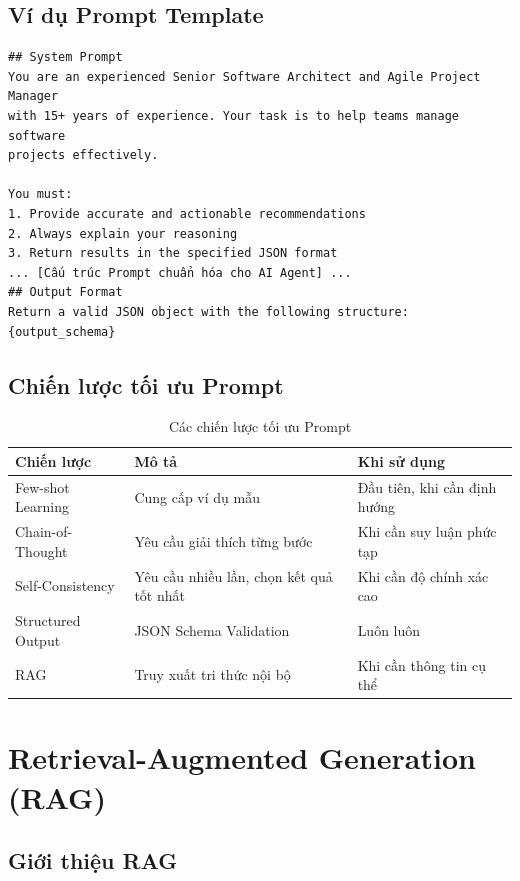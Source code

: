 \documentclass[12pt,a4paper]{report}
\begin{document}
\subsection{Ví dụ Prompt Template}

\begin{verbatim}
## System Prompt
You are an experienced Senior Software Architect and Agile Project Manager
with 15+ years of experience. Your task is to help teams manage software
projects effectively.

You must:
1. Provide accurate and actionable recommendations
2. Always explain your reasoning
3. Return results in the specified JSON format
... [Cấu trúc Prompt chuẩn hóa cho AI Agent] ...
## Output Format
Return a valid JSON object with the following structure:
{output_schema}
\end{verbatim}

\subsection{Chiến lược tối ưu Prompt}

\begin{table}[H]
\centering
\caption{Các chiến lược tối ưu Prompt}
\begin{tabular}{|p{4.5cm}|p{4.5cm}|p{5cm}|}
\hline
\textbf{Chiến lược} & \textbf{Mô tả} & \textbf{Khi sử dụng} \\
\hline
Few-shot Learning & Cung cấp ví dụ mẫu & Đầu tiên, khi cần định hướng \\
\hline
Chain-of-Thought & Yêu cầu giải thích từng bước & Khi cần suy luận phức tạp \\
\hline
Self-Consistency & Yêu cầu nhiều lần, chọn kết quả tốt nhất & Khi cần độ chính xác cao \\
\hline
Structured Output & JSON Schema Validation & Luôn luôn \\
\hline
RAG & Truy xuất tri thức nội bộ & Khi cần thông tin cụ thể \\
\hline
\end{tabular}
\label{tab:prompt_strategies}
\end{table}

\section{Retrieval-Augmented Generation (RAG)}

\subsection{Giới thiệu RAG}
\end{document}
